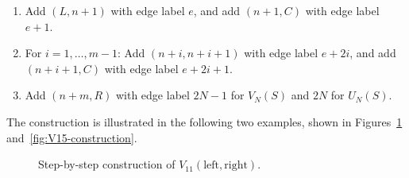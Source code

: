 \documentclass[11pt]{article}
\theoremstyle{definition}
\theoremstyle{plain}
\newcommand{\LeftChoice}{\mathrm{left}}
\newcommand{\RightChoice}{\mathrm{right}}
\begin{document}
\begin{enumerate}[itemsep=0.35em, topsep=0.35em]
\begin{enumerate}
\item \label{it:left_arc} Add $(L, n+1)$ with edge label $e$, and add $(n+1,C)$ with edge label $e+1$.
\item \label{it:mid_arc} For $i = 1, \ldots, m-1$: Add $(n+i, n+i+1)$ with edge label $e+2i$, and add $(n+i+1,C)$ with edge label $e+2i+1$.
\item \label{it:right_arc} Add $(n+m, R)$ with edge label $2N-1$ for $V_N(S)$ and $2N$ for $U_N(S)$. 

\end{enumerate}
\end{enumerate}
\medskip

The construction is illustrated in the following two examples, shown in Figures~\ref{fig:V11-construction} and~\ref{fig:V15-construction}.

\begin{figure}[H]
\centering
\begin{minipage}{0.24\linewidth}
\centering
\resizebox{\linewidth}{!}{}
\caption*{Seed}
\end{minipage}\hfill
\begin{minipage}{0.24\linewidth}
\centering
\resizebox{\linewidth}{!}{}
\caption*{After $s_1=\LeftChoice$}
\end{minipage}\hfill
\begin{minipage}{0.24\linewidth}
\centering
\resizebox{\linewidth}{!}{}
\caption*{After $s_2=\RightChoice$}
\end{minipage}\hfill
\begin{minipage}{0.24\linewidth}
\centering
\resizebox{\linewidth}{!}{}
\caption*{Close the arc}
\end{minipage}
\caption{Step-by-step construction of $V_{11}(\LeftChoice,\RightChoice)$.}
\label{fig:V11-construction}
\end{figure}
\end{document}
